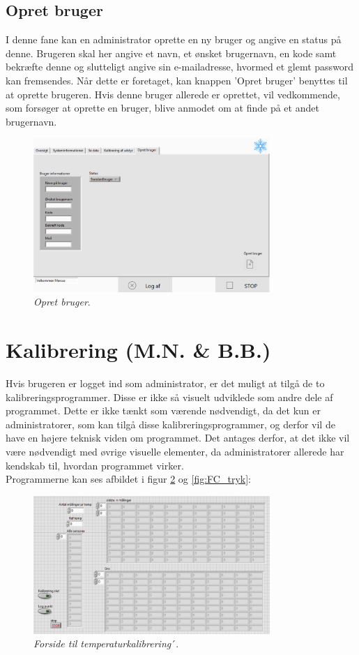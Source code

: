 \documentclass[../Hovedrapport.tex]{subfiles}
\begin{document}
\subsection*{Opret bruger}
I denne fane kan en administrator oprette en ny bruger og angive en status på denne. Brugeren skal her angive et navn, et ønsket brugernavn, en kode samt bekræfte denne og slutteligt angive sin e-mailadresse, hvormed et glemt password kan fremsendes. Når dette er foretaget, kan knappen 'Opret bruger' benyttes til at oprette brugeren. Hvis denne bruger allerede er oprettet, vil vedkommende, som forsøger at oprette en bruger, blive anmodet om at finde på et andet brugernavn. 
\begin{figure}[H]
	\centering
	\includegraphics[width=0.80\textwidth]{Billeder/opret.png}
	\caption{\textit{Opret bruger}.}
	\label{fig:opret_bruger}
\end{figure}
\section{Kalibrering (M.N. \& B.B.)}
Hvis brugeren er logget ind som administrator, er det muligt at tilgå de to kalibreringsprogrammer. Disse er ikke så visuelt udviklede som andre dele af programmet. Dette er ikke tænkt som værende nødvendigt, da det kun er administratorer, som kan tilgå disse kalibreringsprogrammer, og derfor vil de have en højere teknisk viden om programmet. Det antages derfor, at det ikke vil være nødvendigt med øvrige visuelle elementer, da administratorer allerede har kendskab til, hvordan programmet virker. \\
Programmerne kan ses afbildet i figur \ref{fig:FC_temp} og \ref{fig:FC_tryk}:
\begin{figure}[H]
	\centering
	\includegraphics[width=0.80\textwidth]{Billeder/FCkali_termo.png}
	\caption{\textit{Forside til temperaturkalibrering}´.}
	\label{fig:FC_temp}
\end{figure}
\end{document}
